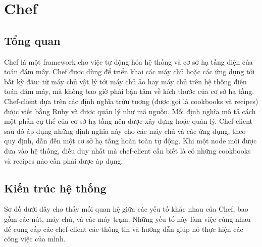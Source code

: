 \section{Chef}

\subsection{Tổng quan}
Chef là một framework cho việc tự động hóa hệ thống và cơ sở hạ tầng điện của toán đám mây. Chef được dùng để triển khai các máy chủ hoặc các ứng dụng tới bất kỳ đâu: từ máy chủ vật lý tới máy chủ ảo hay máy chủ trên hệ thống điện toán đám mây, mà không bao giờ phải bận tâm về kích thước của cơ sở hạ tầng. Chef-client dựa trên các định nghĩa trừu tượng (được gọi là cookbooks và recipes) được viết bằng Ruby và được quản lý như mã nguồn. Mỗi định nghĩa mô tả cách một phần cụ thể của cơ sở hạ tầng nên được xây dựng hoặc quản lý. Chef-client sau đó áp dụng những định nghĩa này cho các máy chủ và các ứng dụng, theo quy định, dẫn đến một cơ sở hạ tầng hoàn toàn tự động. Khi một node mới được đưa vào hệ thống, điều duy nhất mà chef-client cần biết là có những cookbooks và recipes nào cần phải được áp dụng.

\subsection{Kiến trúc hệ thống}

Sơ đồ dưới đây cho thấy mối quan hệ giữa các yếu tố khác nhau của Chef, bao gồm các nút, máy chủ, và các máy trạm. Những yếu tố này làm việc cùng nhau để cung cấp các chef-client các thông tin và hướng dẫn giúp nó thực hiện các công việc của mình.

\newpage
\clearpage

